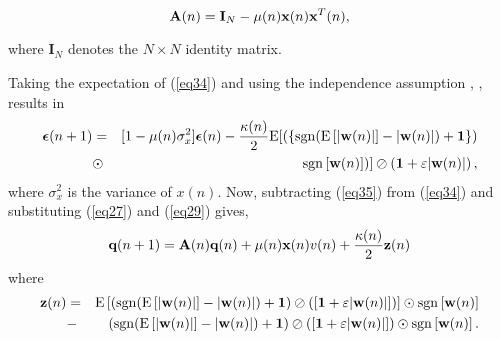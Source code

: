 \vspace{-2cm}
\begin{equation}
\textbf{A}(n)=\textbf{I}_{N}-\mu(n)\textbf{x}(n)\textbf{x}^{T}(n),\label{eqa}\vspace{-0.1cm}
\end{equation}

\vspace{-0.7cm}
\noindent where $\textbf{I}_{N}$ denotes the $N\times N$ identity matrix.

\noindent Taking the expectation of (\ref{eq34}) and using the independence assumption \cite{ Mayyas}, \cite{Hill}, \cite{Claasen} results in
\vspace{-0.1cm}
\begin{eqnarray}
\nonumber
\boldsymbol \epsilon(n+1)&=& [1-\mu(n)\sigma_{x}^{2}]\boldsymbol\epsilon(n)-\frac{\kappa(n)}{2}\mathrm{E}[ \left(\left\{\mathrm{sgn}(\mathrm{E}\left[|\textbf{w}(n)|\right]-|\textbf{w}(n)|) +\textbf{1}\right\}\right)\\
&\odot&\mathrm{sgn}\left[\textbf{w}(n)\right])]\oslash \left(\textbf{1}+\varepsilon|\textbf{w}(n)|\right), \label{eq35}\vspace{-0.1cm}
\end{eqnarray}
\noindent where $\sigma_{x}^{2}$ is the variance of $x(n)$. Now, subtracting (\ref{eq35}) from (\ref{eq34}) and substituting (\ref{eq27}) and (\ref{eq29}) gives,
\vspace{-0.1cm}
\begin{equation}
 \textbf{q}(n+1)=\textbf{A}(n)\textbf{q}(n)+\mu(n)\textbf{x}(n)v(n)+\frac{\kappa(n)}{2} \textbf{z}(n)\label{eq36}\vspace{-0.1cm}
\end{equation}
\noindent where
\vspace{-0.1cm}
\begin{eqnarray}
\nonumber
\textbf{z}(n)&=& \mathrm{E}\left[\left(\mathrm{sgn}(\mathrm{E}\left[|\textbf{w}(n)|\right]-|\textbf{w}(n)|) +\textbf{1}\right)
\oslash \left([\textbf{1}+\varepsilon|\textbf{w}(n)|]\right)\right]\odot\mathrm{sgn}\left[\textbf{w}(n)\right]\\
&-&\left(\mathrm{sgn}(\mathrm{E}\left[|\textbf{w}(n)|\right]-|\textbf{w}(n)|) +\textbf{1}\right)
\oslash \left([\textbf{1}+\varepsilon|\textbf{w}(n)|]\right)\odot\mathrm{sgn}\left[\textbf{w}(n)\right].\label{eqz}\vspace{-0.1cm}
\end{eqnarray}
